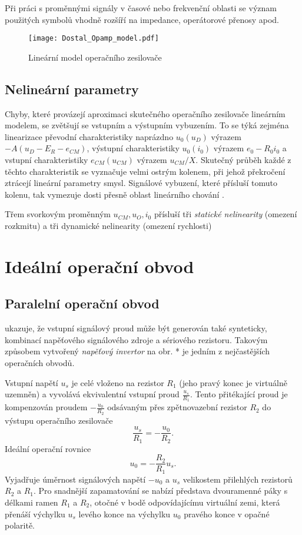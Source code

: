 {      Při práci s proměnnými signály v časové nebo frekvenční oblasti se  význam použitých symbolů 
      vhodně rozšíří na impedance, operátorové přenosy apod.
      \begin{figure}[ht!]
        \centering
        \texttt{[image: Dostal\_Opamp\_model.pdf]}
        \caption[Lineární model operačního zesilovače]{Lineární model operačního zesilovače}
        \label{AES:fig_lin_model_opamp}
      \end{figure}
  
    \subsection{Nelineární parametry}
      Chyby, které provázejí aproximaci skutečného operačního zesilovače lineár\-ním modelem, se 
      zvětšují se vstupním a výstupním vybuzením. To se týká zejména linearizace převodní 
      charakteristiky naprázdno $u_0(u_D)$ výrazem $-A(u_D-E_R-e_{CM})$, výstupní charakteristiky 
      $u_0(i_0)$ výrazem $e_0-R_0i_0$ a vstupní charakteristiky $e_{CM}(u_{CM})$ výrazem 
      $u_{CM}/X$.  Skutečný průběh každé z těchto charakteristik se vyznačuje velmi ostrým kolenem, 
      při jehož překročení ztrácejí lineární parametry smysl.  Signálové vybuzení, které přísluší 
      tomuto kolenu, tak vymezuje dosti přesně oblast lineárního chování \cite[s.~29]{Dostal}.
  
      Třem svorkovým proměnným $u_{CM}, u_O, i_0$ přísluší tři \emph{statické nelinearity} (omezení 
      rozkmitu) a tři dynamické nelinearity (omezení rychlosti)
  
  \section{Ideální operační obvod}
    \subsection{Paralelní operační obvod}
       ukazuje, že vstupní signálový proud může být generován také 
      synteticky, kombinací napěťového signálového zdroje a sériového rezistoru. Takovým způsobem 
      vytvořený \emph{napěťový invertor} na obr. * je jedním z nejčastějších operačních obvodů. 
      
      Vstupní napětí $u_s$ je celé vloženo na rezistor $R_1$ (jeho pravý konec je virtuálně 
      uzemněn) a vyvolává ekvivalentní vstupní proud $\frac{u_s}{R_1}$. Tento přitékající proud je 
      kompenzován proudem $-\frac{u_0}{R_2}$ odsávaným přes zpětnovazební rezistor $R_2$ do výstupu 
      operačního zesilovače $$\frac{u_s}{R_1}=-\frac{u_0}{R_2}.$$ Ideální operační rovnice
      \begin{equation}\label{AES:eq_opamp_inv02}
        u_0 = - \frac{R_2}{R_1}u_s.
      \end{equation}
      Vyjadřuje úměrnost signálových napětí $-u_0$ a $u_s$ velikostem přilehlých rezistorů $R_2$ a 
      $R_1$. Pro snadnější zapamatování se nabízí představa dvouramenné páky s délkami ramen $R_1$ 
      a $R_2$, otočné v bodě odpovídajícímu virtuální zemi, která přenáší výchylku $u_s$ levého 
      konce na výchylku $u_0$ pravého konce v opačné polaritě.

}
